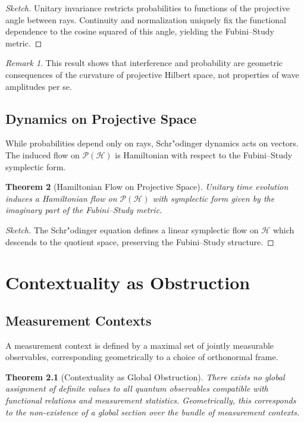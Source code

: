 \documentclass[12pt]{book}
\theoremstyle{plain}
\newtheorem{theorem}{Theorem}[chapter]
\theoremstyle{definition}
\theoremstyle{remark}
\newtheorem{remark}[theorem]{Remark}
\begin{document}
\begin{proof}[Sketch]
Unitary invariance restricts probabilities to functions of the projective angle between rays. Continuity and normalization uniquely fix the functional dependence to the cosine squared of this angle, yielding the Fubini--Study metric.
\end{proof}

\begin{remark}
This result shows that interference and probability are geometric consequences of the curvature of projective Hilbert space, not properties of wave amplitudes per se.
\end{remark}

\section{Dynamics on Projective Space}

While probabilities depend only on rays, Schr"odinger dynamics acts on vectors. The induced flow on $\mathcal{P}(\mathcal{H})$ is Hamiltonian with respect to the Fubini--Study symplectic form.

\begin{theorem}[Hamiltonian Flow on Projective Space]
Unitary time evolution induces a Hamiltonian flow on $\mathcal{P}(\mathcal{H})$ with symplectic form given by the imaginary part of the Fubini--Study metric.
\end{theorem}

\begin{proof}[Sketch]
The Schr"odinger equation defines a linear symplectic flow on $\mathcal{H}$ which descends to the quotient space, preserving the Fubini--Study structure.
\end{proof}

\chapter{Contextuality as Obstruction}

\section{Measurement Contexts}
A measurement context is defined by a maximal set of jointly measurable observables, corresponding geometrically to a choice of orthonormal frame.

\begin{theorem}[Contextuality as Global Obstruction]
There exists no global assignment of definite values to all quantum observables compatible with functional relations and measurement statistics. Geometrically, this corresponds to the non-existence of a global section over the bundle of measurement contexts.
\end{theorem}
\end{document}

